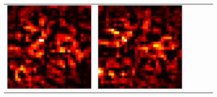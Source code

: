 \documentclass[preprint,12pt]{elsarticle}
\begin{document}
\begin{figure}[p]
\begin{tabular}{cccccc}
  \includegraphics[scale=\scale]{../visualizations/examples/cifar10/cnn/positive_saliency_map/7.png} & 
  \includegraphics[scale=\scale]{../visualizations/examples/cifar10/cnn/negative_saliency_map/7.png} & 

\end{tabular}
\end{figure}
\end{document}
